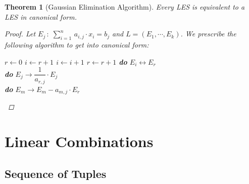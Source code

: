 \documentclass[12pt]{article}
\newtheorem{theorem}{Theorem}[subsection]
\begin{document}
\begin{theorem}[Gaussian Elimination Algorithm]
  Every LES is equivalent to a LES in canonical form.
  \begin{proof}
    Let $E_j\,:\;\displaystyle\sum_{i=1}^n\,a_{i,j}\cdot x_i=b_j$ and $L=(E_1,\cdots,E_k)$. We prescribe the following algorithm to get into canonical form:

    \begin{algorithm}[H]
      \caption{Gaussian Elimination Algorithm}
      \begin{algorithmic}
        \State $r\gets 0$
          \State $i\gets r+1$
            \State $i\gets i+1$
          \EndWhile
            \State $r\gets r+1$
            \State \textbf{do} $E_i\leftrightarrow E_r$\\
            \State \textbf{do} $E_j\to \dfrac{1}{a_{r,j}}\cdot E_j$\\
                \State \textbf{do} $E_m\rightarrow E_m-a_{m,j}\cdot E_r$
              \EndIf
            \EndFor
          \EndIf
        \EndFor
      \end{algorithmic}
      \label{Gaussian Elimination}
    \end{algorithm}

  \end{proof}
\end{theorem}

\pagebreak

\section{Linear Combinations}

\subsection{Sequence of Tuples}
\end{document}
